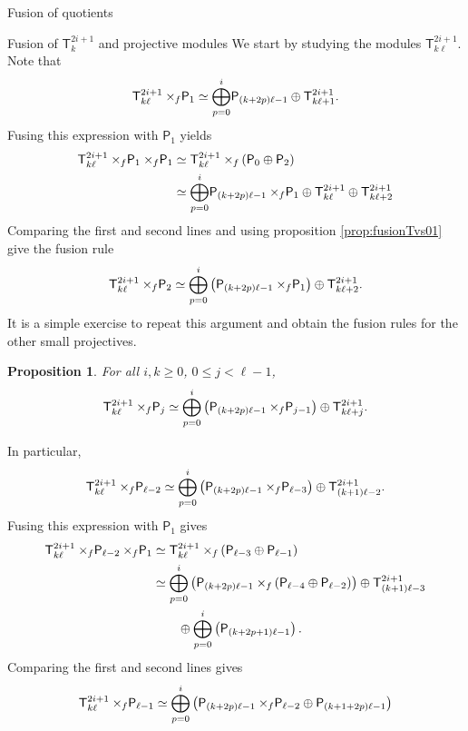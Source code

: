 \documentclass[reqno]{amsart}
\newtheorem{Prop}[Thm]{Proposition}
\newcommand{\dP}[1]{\mathsf P_{#1}}
\newcommand{\xf}{\times\hspace{-0.27em}_f}
\newcommand{\T}[2]{\mathsf{T}^{#1}_{#2}}
\newcommand{\lc}{\ell}
\begin{document}
\begin{section}{Fusion of quotients}
\begin{subsection}{Fusion of $\T{2i+1}{k}$ and projective modules}
We start by studying the modules $\T{2i+1}{k\lc}$. Note that
\begin{equation*}
	\T{2i+1}{k\lc} \xf \dP{1} \simeq \overset{i}{\underset{p=0}{\bigoplus}} \dP{(k+2p)\lc-1} \oplus \T{2i+1}{k\lc +1}.
\end{equation*}
Fusing this expression with $\dP{1}$ yields
\begin{align*}
\T{2i+1}{k\lc} \xf \dP{1}\xf \dP{1} &\simeq \T{2i+1}{k\lc} \xf \left(\dP{0} \oplus \dP{2} \right)\\
	& \simeq \overset{i}{\underset{p=0}{\bigoplus}} \dP{(k+2p)\lc-1} \xf \dP{1} \oplus \T{2i+1}{k\lc} \oplus \T{2i+1}{k\lc+2}
\end{align*}
Comparing the first and second lines and using proposition \ref{prop:fusionTvs01} give the fusion rule
\begin{equation*}
	\T{2i+1}{k\lc}\xf\dP{2} \simeq \overset{i}{\underset{p=0}{\bigoplus}}\left( \dP{(k+2p)\lc-1} \xf \dP{1}\right) \oplus \T{2i+1}{k\lc+2}.
\end{equation*}
It is a simple exercise to repeat this argument and obtain the fusion rules for the other small projectives.
\begin{Prop}\label{prop:fusionTvssmallP}
For all $i,k \geq 0$, $0\leq j<\lc-1$,
\begin{equation}
\T{2i+1}{k\lc}\xf\dP{j} \simeq \overset{i}{\underset{p=0}{\bigoplus}}\left( \dP{(k+2p)\lc-1} \xf \dP{j-1} \right)\oplus \T{2i+1}{k\lc+j}.
\end{equation}
\end{Prop}
In particular,
\begin{equation*}
\T{2i+1}{k\lc} \xf \dP{\lc-2} \simeq \overset{i}{\underset{p=0}{\bigoplus}}\left( \dP{(k+2p)\lc-1} \xf \dP{\lc-3}\right) \oplus \T{2i+1}{(k+1)\lc-2}.
\end{equation*}
Fusing this expression with $\dP{1}$ gives
\begin{align*}
\T{2i+1}{k\lc} \xf \dP{\lc-2} \xf \dP{1} & \simeq \T{2i+1}{k\lc}\xf \left(\dP{\lc-3} \oplus \dP{\lc-1}\right) \\
	& \simeq \overset{i}{\underset{p=0}{\bigoplus}}\left( \dP{(k+2p)\lc-1} \xf \left(\dP{\lc-4} \oplus \dP{\lc-2} \right)\right) \oplus \T{2i+1}{(k+1)\lc-3} \\
	& \qquad \oplus \overset{i}{\underset{p=0}{\bigoplus}}\left( \dP{(k+2p+1)\lc-1}\right).
\end{align*}
Comparing the first and second lines gives
\begin{align}\label{eq:fusionTvsP.1}
	\T{2i+1}{k\lc} \xf \dP{\lc-1} & \simeq \overset{i}{\underset{p=0}{\bigoplus}}\left( \dP{(k+2p)\lc-1}\xf \dP{\lc-2} \oplus \dP{(k+1+2p)\lc-1}\right) \notag \\

\end{align}
\end{subsection}
\end{section}
\end{document}
